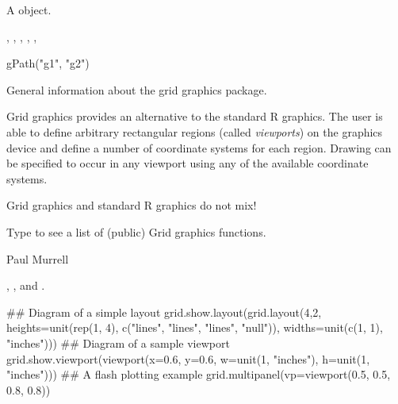 %
\begin{Value}
A  object.
\end{Value}
%
\begin{SeeAlso}\relax
{},
,
,
,
,
\end{SeeAlso}
%
\begin{Examples}
\begin{ExampleCode}
gPath("g1", "g2")
\end{ExampleCode}
\end{Examples}
%
\begin{Description}\relax
General information about the grid graphics package.
\end{Description}
%
\begin{Details}\relax
Grid graphics provides an alternative to the standard R graphics.
The user is able to define arbitrary rectangular regions (called
\emph{viewports}) on the graphics device and define a number of
coordinate systems for each region.  Drawing can be specified to occur
in any viewport using any of the available coordinate systems.

Grid graphics and standard R graphics do not mix!

Type  to see a list of (public)
Grid graphics functions.
\end{Details}
%
\begin{Author}\relax
Paul Murrell
\end{Author}
%
\begin{SeeAlso}\relax
{},
, and
.
\end{SeeAlso}
%
\begin{Examples}
\begin{ExampleCode}
## Diagram of a simple layout 
grid.show.layout(grid.layout(4,2,
                     heights=unit(rep(1, 4),
                                  c("lines", "lines", "lines", "null")),
                     widths=unit(c(1, 1), "inches")))
## Diagram of a sample viewport
grid.show.viewport(viewport(x=0.6, y=0.6,
                            w=unit(1, "inches"), h=unit(1, "inches")))
## A flash plotting example
grid.multipanel(vp=viewport(0.5, 0.5, 0.8, 0.8))
\end{ExampleCode}
\end{Examples}
